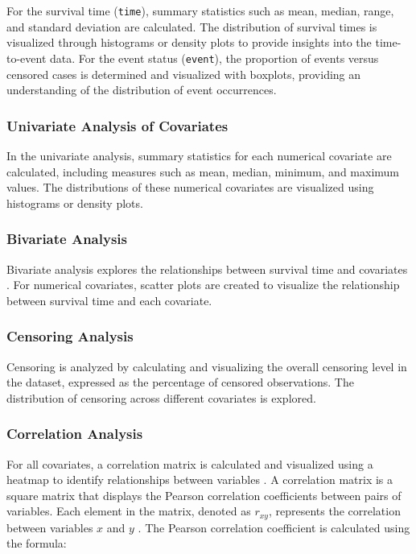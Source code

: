 For the survival time (\texttt{time}), summary statistics such as mean, median, range, and standard deviation are calculated. The distribution of survival times is visualized through histograms or density plots to provide insights into the time-to-event data. For the event status (\texttt{event}), the proportion of events versus censored cases is determined and visualized with boxplots, providing an understanding of the distribution of event occurrences.

\subsubsection*{Univariate Analysis of Covariates}

In the univariate analysis, summary statistics for each numerical covariate are calculated, including measures such as mean, median, minimum, and maximum values. The distributions of these numerical covariates are visualized using histograms or density plots. 

\subsubsection*{Bivariate Analysis}

Bivariate analysis explores the relationships between survival time and covariates \parencite{harrell__regression_2015}. For numerical covariates, scatter plots are created to visualize the relationship between survival time and each covariate. 

\subsubsection*{Censoring Analysis}

Censoring is analyzed by calculating and visualizing the overall censoring level in the dataset, expressed as the percentage of censored observations. The distribution of censoring across different covariates is explored.
\subsubsection*{Correlation Analysis}
For all covariates, a correlation matrix is calculated and visualized using a heatmap to identify relationships between variables \parencite{harrell__regression_2015}. A correlation matrix is a square matrix that displays the Pearson correlation coefficients between pairs of variables. Each element in the matrix, denoted as \( r_{xy} \), represents the correlation between variables \( x \) and \( y \) \parencite{harrell__regression_2015}. The Pearson correlation coefficient is calculated using the formula:

